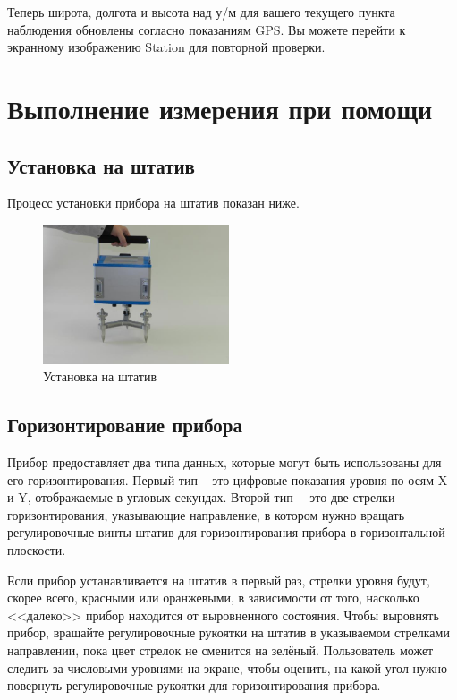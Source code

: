 Теперь широта, долгота и высота над у/м для вашего текущего пункта наблюдения
обновлены согласно показаниям GPS. Вы можете перейти к экранному изображению
Station для повторной проверки.

\section[Выполнение измерений]{Выполнение измерения при помощи \cg{}}

\subsection[Установка на штатив]{Установка \cg{} на штатив}

Процесс установки прибора \cg{} на штатив показан ниже.

\begin{figure}[h]
  \centering
  \includegraphics[width=0.49\textwidth]{figures/placing_the_cg6_autograv_on_its_tripod}
  \caption{Установка \cg{} на штатив}
  \label{fig:placing_the_cg6_autograv_on_its_tripod}
\end{figure}

\subsection[Горизонтирование прибора]{Горизонтирование прибора \cg{}}
\label{subsec:leveling_the_cg6_autograv}

Прибор \cg{} предоставляет два типа данных, которые могут быть использованы для
его горизонтирования. Первый тип~- это цифровые показания уровня по осям X и Y,
отображаемые в угловых секундах. Второй тип~-- это две стрелки горизонтирования,
указывающие направление, в котором нужно вращать регулировочные винты штатив 
для горизонтирования прибора в горизонтальной плоскости.

Если прибор устанавливается на штатив в первый раз, стрелки уровня будут, скорее
всего, красными или оранжевыми, в зависимости от того, насколько <<далеко>>
прибор находится от выровненного состояния. Чтобы выровнять прибор, вращайте
регулировочные рукоятки на штатив в указываемом стрелками направлении, пока цвет
стрелок не сменится на зелёный. Пользователь может следить за числовыми уровнями
на экране, чтобы оценить, на какой угол нужно повернуть регулировочные рукоятки
для горизонтирования прибора.


